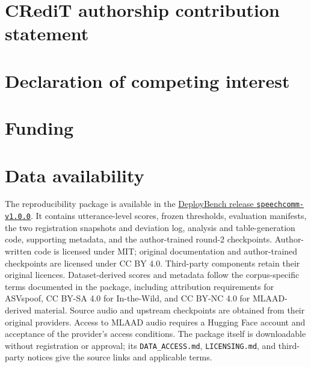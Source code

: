 \section*{CRediT authorship contribution statement}

\section*{Declaration of competing interest}

\section*{Funding}

\section*{Data availability}
The reproducibility package is available in the
\href{https://github.com/henryhoang207/Deploy-Bench/releases/tag/speechcomm-v1.0.0}{DeployBench release \texttt{speechcomm-v1.0.0}}.
It contains utterance-level scores, frozen thresholds, evaluation manifests, the two registration snapshots and
deviation log, analysis and table-generation code, supporting metadata, and the author-trained round-2 checkpoints.
Author-written code is licensed under MIT; original documentation and author-trained checkpoints are licensed under
CC BY 4.0. Third-party components retain their original licences. Dataset-derived scores and metadata follow the
corpus-specific terms documented in the package, including attribution requirements for ASVspoof, CC BY-SA 4.0
for In-the-Wild, and CC BY-NC 4.0 for MLAAD-derived material. Source audio and upstream checkpoints are obtained
from their original providers. Access to MLAAD audio requires a Hugging Face account and acceptance of the
provider's access conditions. The package itself is downloadable without registration or approval; its
\texttt{DATA\_ACCESS.md}, \texttt{LICENSING.md}, and third-party notices give the source links and applicable terms.

